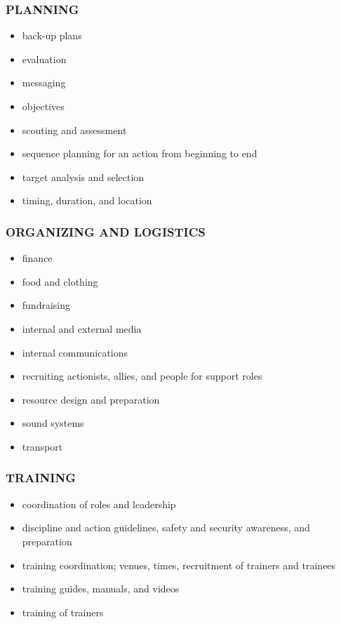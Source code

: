 \documentclass[twoside,a4paper,12pt,fleqn,openany]{extbook}
\begin{document}
\subsubsection*{PLANNING}

\begin{itemize}
\item back-up plans
\item evaluation
\item messaging
\item objectives
\item scouting and assessment
\item sequence planning for an action from beginning to end
\item target analysis and selection
\item timing, duration, and location
\end{itemize}

\subsubsection*{ORGANIZING AND LOGISTICS}

\begin{itemize}
\item finance
\item food and clothing
\item fundraising
\item internal and external media
\item internal communications
\item recruiting actionists, allies, and people for support roles
\item resource design and preparation
\item sound systems
\item transport
\end{itemize}

\subsubsection*{TRAINING}

\begin{itemize}
\item coordination of roles and leadership
\item discipline and action guidelines, safety and security awareness, and preparation
\item training coordination; venues, times, recruitment of trainers and trainees
\item training guides, manuals, and videos
\item training of trainers
\end{itemize}
\end{document}
